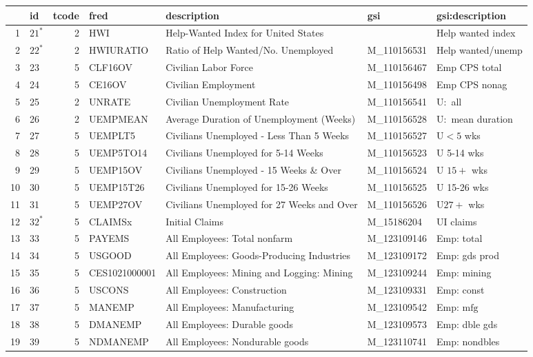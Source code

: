 \begin{landscape}
\begin{singlespace}
\begin{longtable}{rlrllll}
\hline & id & tcode & fred & description & gsi & gsi:description \\
\hline 1 & $21^{*}$ & 2 & HWI & Help-Wanted Index for United States & & Help wanted index \\
 2 & $22^{*}$ & 2 & HWIURATIO & Ratio of Help Wanted/No. Unemployed & M\_110156531 & Help wanted/unemp \\
 3 & 23 & 5 & CLF16OV & Civilian Labor Force & M\_110156467 & Emp CPS total \\
 4 & 24 & 5 & CE16OV & Civilian Employment & M\_110156498 & Emp CPS nonag \\
 5 & 25 & 2 & UNRATE & Civilian Unemployment Rate & M\_110156541 & $\mathrm{U}:$ all \\
 6 & 26 & 2 & UEMPMEAN & Average Duration of Unemployment (Weeks) & M\_110156528 & $\mathrm{U}:$ mean duration \\
 7 & 27 & 5 & UEMPLT5 & Civilians Unemployed - Less Than 5 Weeks & M\_110156527 & $\mathrm{U}<5$ wks \\
 8 & 28 & 5 & UEMP5TO14 & Civilians Unemployed for 5-14 Weeks & M\_110156523 & U 5-14 wks \\
 9 & 29 & 5 & UEMP15OV & Civilians Unemployed - 15 Weeks \& Over & M\_110156524 & U $15+$ wks \\
 10 & 30 & 5 & UEMP15T26 & Civilians Unemployed for 15-26 Weeks & M\_110156525 & U 15-26 wks \\
 11 & 31 & 5 & UEMP27OV & Civilians Unemployed for 27 Weeks and Over & M\_110156526 & $\mathrm{U} 27+$ wks \\
 12 & $32^{*}$ & 5 & CLAIMSx & Initial Claims & M\_15186204 & UI claims \\
 13 & 33 & 5 & PAYEMS & All Employees: Total nonfarm & M\_123109146 & Emp: total \\
 14 & 34 & 5 & USGOOD & All Employees: Goods-Producing Industries & M\_123109172 & Emp: gds prod \\
 15 & 35 & 5 & CES1021000001 & All Employees: Mining and Logging: Mining & M\_123109244 & Emp: mining \\
 16 & 36 & 5 & USCONS & All Employees: Construction & M\_123109331 & Emp: const \\
 17 & 37 & 5 & MANEMP & All Employees: Manufacturing & M\_123109542 & Emp: $\mathrm{mfg}$ \\
 18 & 38 & 5 & DMANEMP & All Employees: Durable goods & M\_123109573 & Emp: dble gds \\
 19 & 39 & 5 & NDMANEMP & All Employees: Nondurable goods & M\_123110741 & Emp: nondbles \\

\end{longtable}
\end{singlespace}
\end{landscape}
